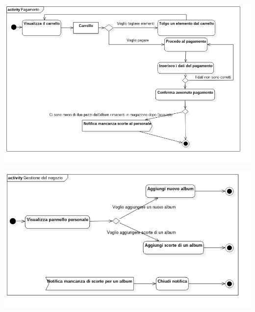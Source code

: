 \begin{center}
    \includegraphics[width=\textwidth]{diagram/activity-pagamento.png}
\end{center}

\begin{center}
    \includegraphics[width=\textwidth]{diagram/activity-negozio.png}
\end{center}